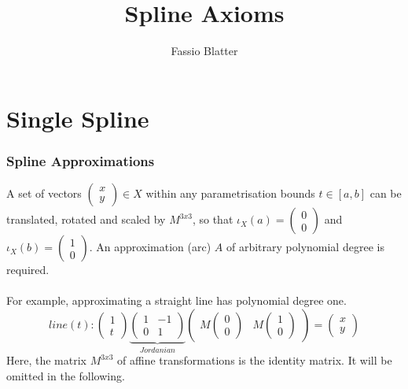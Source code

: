 \documentclass[a4paper,portrait]{report}
\begin{document}
\title{Spline Axioms}
\author{Fassio Blatter}
\maketitle

\chapter{Single Spline}

\subsection{Spline Approximations}
A set of vectors $\begin{pmatrix}x \\ y\end{pmatrix} \in X$ within any parametrisation bounds $t\in[a,b]$ can be translated, rotated and scaled by $M^{3x3}$, so that $\iota_{X}(a)=\begin{pmatrix}0 \\ 0\end{pmatrix}$ and $\iota_{X}(b)=\begin{pmatrix}1 \\ 0\end{pmatrix}$. An approximation (arc) $A$ of arbitrary polynomial degree is required.\\\\
For example, approximating a straight line has polynomial degree one.
\begin{equation}
line(t):
\begin{pmatrix}
1 \\
t
\end{pmatrix}
\underbrace{\begin{pmatrix}
1 & -1\\
0 & 1
\end{pmatrix}}_{Jordanian}
\begin{pmatrix}
M \begin{pmatrix} 0 \\ 0 \end{pmatrix} & M \begin{pmatrix} 1 \\ 0 \end{pmatrix}
\end{pmatrix}
=
\begin{pmatrix}
x \\
y
\end{pmatrix}
\end{equation}
Here, the matrix $M^{3x3}$ of affine transformations is the identity matrix. It will be omitted in the following.\\\\
\end{document}
